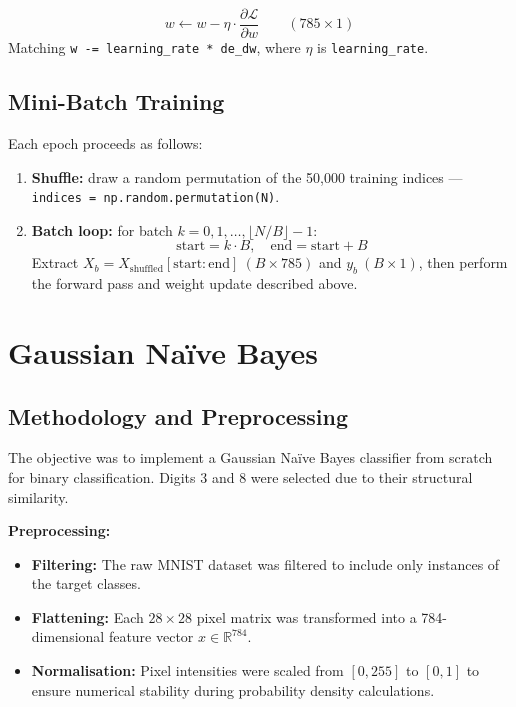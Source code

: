 \documentclass[11pt,a4paper]{article}
\begin{document}
\[
w \leftarrow w - \eta \cdot \frac{\partial \mathcal{L}}{\partial w} \qquad (785 \times 1)
\]
Matching \texttt{w -= learning\_rate * de\_dw}, where $\eta$ is \texttt{learning\_rate}.

\subsection{Mini-Batch Training}

Each epoch proceeds as follows:

\begin{enumerate}
    \item \textbf{Shuffle:} draw a random permutation of the 50,000 training indices ---
    \texttt{indices = np.random.permutation(N)}.

    \item \textbf{Batch loop:} for batch $k = 0, 1, \ldots, \lfloor N/B \rfloor - 1$:
    \[
    \text{start} = k \cdot B, \quad \text{end} = \text{start} + B
    \]
    Extract $X_b = X_{\text{shuffled}}[\text{start}:\text{end}]\ (B\times 785)$ and $y_b\ (B\times 1)$,
    then perform the forward pass and weight update described above.
   
\end{enumerate}

\section{Gaussian Na\"{i}ve Bayes}

\subsection{Methodology and Preprocessing}
The objective was to implement a Gaussian Na\"{i}ve Bayes classifier from scratch for binary classification. Digits 3 and 8 were selected due to their structural similarity.

\noindent\textbf{Preprocessing:}
\begin{itemize}
    \item \textbf{Filtering:} The raw MNIST dataset was filtered to include only instances of the target classes.
    \item \textbf{Flattening:} Each $28\times28$ pixel matrix was transformed into a 784-dimensional feature vector $x \in \mathbb{R}^{784}$.
    \item \textbf{Normalisation:} Pixel intensities were scaled from $[0, 255]$ to $[0, 1]$ to ensure numerical stability during probability density calculations.
\end{itemize}
\end{document}
